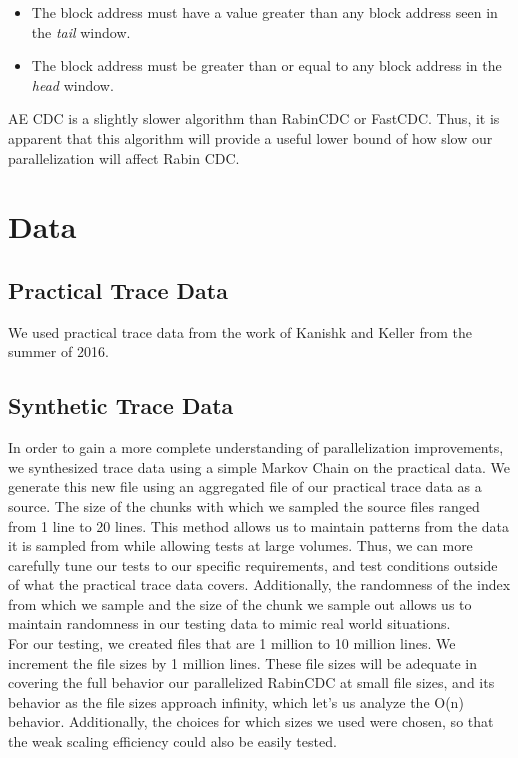 \documentclass{acmtog} %
\begin{document}
	\begin{itemize}
	\item The block address must have a value greater than any block address seen in the \textit{tail} window.
	\item The block address must be greater than or equal to any block address in the \textit{head} window.
	\end{itemize}
	
	AE CDC is a slightly slower algorithm than RabinCDC or FastCDC. Thus, it is apparent that this algorithm will provide a useful lower bound of how slow our parallelization will affect Rabin CDC.

	\section{Data}
	\subsection{Practical Trace Data}
	We used practical trace data from the work of Kanishk and Keller from the summer of 2016. \\
	\subsection{Synthetic Trace Data}
	In order to gain a more complete understanding of parallelization improvements, we synthesized trace data using a simple Markov Chain on the practical data. We generate this new file using an aggregated file of our practical trace data as a source. The size of the chunks with which we sampled the source files ranged from 1 line to 20 lines. This method allows us to maintain patterns from the data it is sampled from while allowing tests at large volumes. Thus, we can more carefully tune our tests to our specific requirements, and test conditions outside of what the practical trace data covers. Additionally, the randomness of the index from which we sample and the size of the chunk we sample out allows us to maintain randomness in our testing data to mimic real world situations.\\
	
	For our testing, we created files that are 1 million to 10 million lines. We increment the file sizes by 1 million lines. These file sizes will be adequate in covering the full behavior our parallelized RabinCDC at small file sizes, and its behavior as the file sizes approach infinity, which let's us analyze the O(n) behavior. Additionally, the choices for which sizes we used were chosen, so that the weak scaling efficiency could also be easily tested.
	
\end{document}

